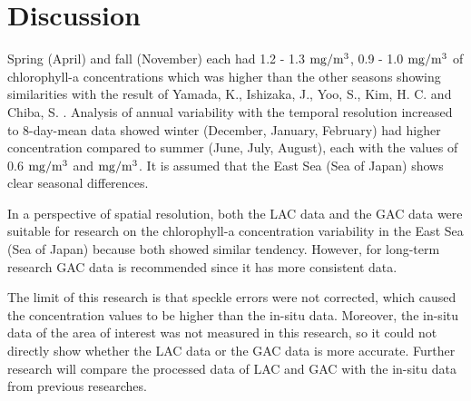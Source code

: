 \section{Discussion}
Spring (April) and fall (November) each had 1.2 - 1.3 $\rm mg/m^3$, 0.9 - 1.0 $\rm mg/m^3$ of chlorophyll-a concentrations which was higher than the other seasons showing similarities with the result of Yamada, K., Ishizaka, J., Yoo, S., Kim, H. C. and Chiba, S. \cite{yamada2004seasonal}. Analysis of annual variability with the temporal resolution increased to 8-day-mean data showed winter (December, January, February) had higher concentration compared to summer (June, July, August), each with the values of 0.6 $\rm mg/m^3$ and $\rm mg/m^3$. It is assumed that the East Sea (Sea of Japan) shows clear seasonal differences.

In a perspective of spatial resolution, both the LAC data and the GAC data were suitable for research on the chlorophyll-a concentration variability in the East Sea (Sea of Japan) because both showed similar tendency. However, for long-term research GAC data is recommended since it has more consistent data. 

The limit of this research is that speckle errors were not corrected, which caused the concentration values to be higher than the in-situ data. Moreover, the in-situ data of the area of interest was not measured in this research, so it could not directly show whether the LAC data or the GAC data is more accurate. Further research will compare the processed data of LAC and GAC with the in-situ data from previous researches.
